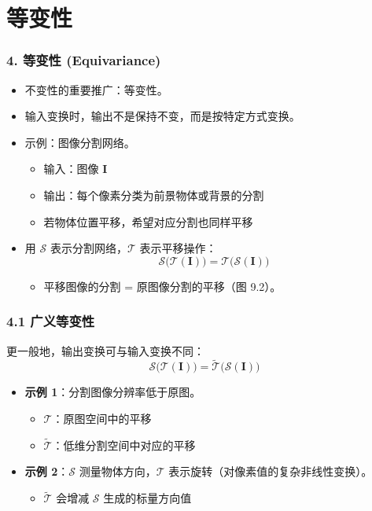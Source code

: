 \documentclass[t,aspectratio=169]{beamer} %
\begin{document}
\section{等变性}

\begin{frame}
    \frametitle{4. 等变性 (Equivariance)}
    \begin{itemize}
        \item 不变性的重要推广：\alert{等变性}。
        \item 输入变换时，输出\alert{不是保持不变，而是按特定方式变换}。
        \item 示例：图像分割网络。
        \begin{itemize}
            \item 输入：图像 $\mathbf{I}$
            \item 输出：每个像素分类为前景物体或背景的分割
            \item 若物体位置平移，希望对应分割也\alert{同样平移}
        \end{itemize}
        \item 用 $\mathcal{S}$ 表示分割网络，$\mathcal{T}$ 表示平移操作：
        \begin{equation}
            \mathcal{S}\bigl(\mathcal{T}(\mathbf{I})\bigr) = \mathcal{T}\bigl(\mathcal{S}(\mathbf{I})\bigr)
            \tag{9.2}
        \end{equation}
        \begin{itemize}
            \item 平移图像的分割 = 原图像分割的平移（图 9.2）。
        \end{itemize}
    \end{itemize}
\end{frame}

\begin{frame}
    \frametitle{4.1 广义等变性}
    更一般地，输出变换可与输入变换不同：
    \begin{equation}
        \mathcal{S}\bigl(\mathcal{T}(\mathbf{I})\bigr) = \widetilde{\mathcal{T}}\bigl(\mathcal{S}(\mathbf{I})\bigr)
        \tag{9.3}
    \end{equation}
    \begin{itemize}
        \item \textbf{示例 1}：分割图像分辨率低于原图。
        \begin{itemize}
            \item $\mathcal{T}$：原图空间中的平移
            \item $\widetilde{\mathcal{T}}$：低维分割空间中对应的平移
        \end{itemize}
        \item \textbf{示例 2}：$\mathcal{S}$ 测量物体方向，$\mathcal{T}$ 表示旋转（对像素值的复杂非线性变换）。
        \begin{itemize}
            \item $\widetilde{\mathcal{T}}$ 会增减 $\mathcal{S}$ 生成的标量方向值
        \end{itemize}
    \end{itemize}
\end{frame}
\end{document}
